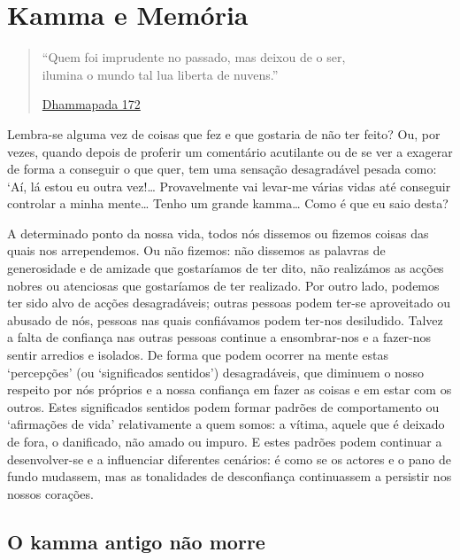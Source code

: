 
\chapter{Kamma e Memória}


\begin{quote}

``Quem foi imprudente no passado, mas deixou de o ser,\\
ilumina o mundo tal lua liberta de nuvens.''

\href{https://suttacentral.net/dhp167-178/en/buddharakkhita}{Dhammapada 172}

\end{quote}

Lembra-se alguma vez de coisas que fez e que gostaria de não ter feito? Ou, por
vezes, quando depois de proferir um comentário acutilante ou de se ver a
exagerar de forma a conseguir o que quer, tem uma sensação desagradável pesada
como: `Aí, lá estou eu outra vez!\ldots{} Provavelmente vai levar-me várias vidas até
conseguir controlar a minha mente\ldots{} Tenho um grande kamma\ldots{} Como é
que eu saio desta?\textquotesingle{}

A determinado ponto da nossa vida, todos nós dissemos ou fizemos coisas das
quais nos arrependemos. Ou não fizemos: não dissemos as palavras de generosidade
e de amizade que gostaríamos de ter dito, não realizámos as acções nobres ou
atenciosas que gostaríamos de ter realizado. Por outro lado, podemos ter sido
alvo de acções desagradáveis; outras pessoas podem ter-se aproveitado ou abusado
de nós, pessoas nas quais confiávamos podem ter-nos desiludido. Talvez a falta
de confiança nas outras pessoas continue a \mbox{ensombrar-nos} e a fazer-nos
sentir arredios e isolados. De forma que podem ocorrer na mente estas
`percepções' (ou `significados sentidos') desagradáveis, que diminuem o nosso
respeito por nós próprios e a nossa confiança em fazer as coisas e em estar com
os outros. Estes significados sentidos podem formar padrões de comportamento ou
`afirmações de vida' relativamente a quem somos: a vítima, aquele que é deixado
de fora, o danificado, não amado ou impuro. E estes padrões podem continuar a
desenvolver-se e a influenciar diferentes cenários: é como se os actores e o
pano de fundo mudassem, mas as tonalidades de desconfiança continuassem a
persistir nos nossos corações.

\section{O kamma antigo não morre}

